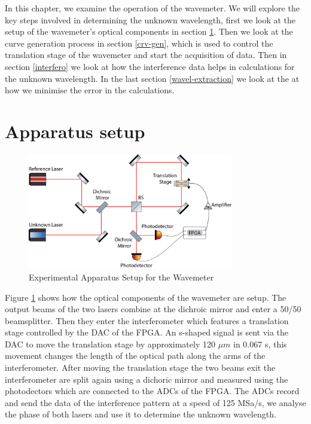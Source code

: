 \documentclass[12pt, twoside]{report}
\begin{document}
In this chapter, we examine the operation of the wavemeter. We will explore the key steps involved in determining the unknown wavelength, first we look at the setup of the wavemeter's optical components in section \ref{exp-setup}. Then we look at the curve generation process in section \ref{crv-gen}, which is used to control the translation stage of the wavemeter and start the acquisition of data. Then in section \ref{interfero} we look at how the interference data helps in calculations for the unknown wavelength. In the last section \ref{wavel-extraction} we look at the at how we minimise the error in the calculations.

\section{Apparatus setup}\label{exp-setup}

\begin{figure}[H]
    \centering
    \includegraphics[width=0.8\textwidth]{figs/experimental-setup.png}
    \caption{Experimental Apparatus Setup for the Wavemeter}
    \label{fig:wavemeter-setup}
\end{figure}

Figure \ref{fig:wavemeter-setup} shows how the optical components of the wavemeter are setup. The output beams of the two lasers combine at the dichroic mirror and enter a 50/50 beamsplitter. Then they enter the interferometer which features a translation stage controlled by the DAC of the FPGA. An s-shaped signal is sent via the DAC to move the translation stage by approximately 120 $\mu m$ in 0.067 s, this movement changes the length of the optical path along the arms of the interferometer. After moving the translation stage the two beams exit the interferometer are split again using a dichoric mirror and measured using the photodectors which are connected to the ADCs of the FPGA. The ADCs record and send the data of the interference pattern at a speed of 125 MSa/s, we analyse the phase of both lasers and use it to determine the unknown wavelength.
\end{document}
